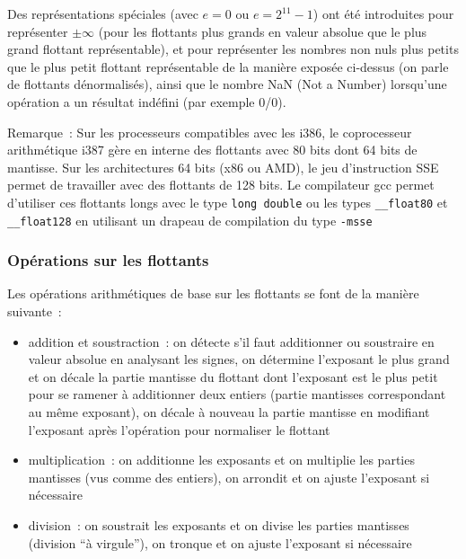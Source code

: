 \documentclass[a4paper,11pt]{article}
\begin{document}
Des représentations spéciales (avec $e=0$ ou $e=2^{11}-1$) 
ont été introduites
pour représenter $\pm \infty$ (pour les flottants plus grands
en valeur absolue que le plus grand flottant représentable), et pour
repr\'esenter les
nombres non nuls plus petits que le plus petit flottant représentable
de la manière exposée ci-dessus (on parle de flottants dénormalisés),
ainsi que le nombre NaN (Not a Number) lorsqu'une opération a un résultat
indéfini (par exemple 0/0).

Remarque~: Sur les processeurs compatibles avec les i386, 
le coprocesseur arithmétique i387 gère en interne des flottants
avec 80 bits dont 64 bits de mantisse. Sur les architectures 64 bits
(x86 ou AMD), le jeu d'instruction SSE permet de travailler avec
des flottants de 128 bits. Le compilateur gcc permet d'utiliser
ces flottants longs avec le type \verb|long double| ou
les types \verb|__float80| et \verb|__float128| en utilisant
un drapeau de compilation du type \verb|-msse|

\subsubsection{Op\'erations sur les flottants}
Les opérations arithmétiques de base sur les flottants
se font de la manière suivante~:
\begin{itemize}
\item addition et soustraction~: on détecte s'il faut additionner
ou soustraire en valeur absolue en analysant les signes,
on détermine l'exposant le plus grand et on décale la partie mantisse 
du flottant dont l'exposant est le plus petit pour se ramener à additionner
deux entiers (partie mantisses correspondant au même exposant), 
on décale à nouveau la partie mantisse en modifiant l'exposant 
après l'opération pour normaliser le flottant
\item multiplication~: on additionne les exposants et on multiplie
les parties mantisses (vus comme des entiers), on arrondit et
on ajuste l'exposant si nécessaire
\item division~: on soustrait les exposants et on divise les parties
mantisses (division ``à virgule''), on tronque et on
ajuste l'exposant si nécessaire
\end{itemize}
\end{document}
